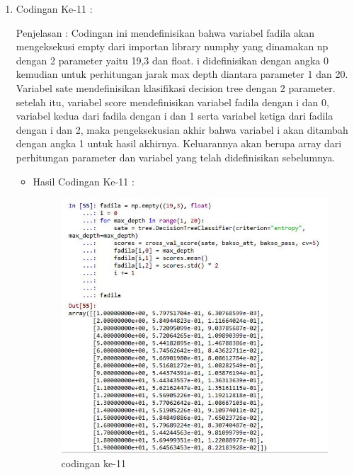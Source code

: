 \begin{enumerate}
\begin{enumerate}
\begin{enumerate}
\begin{itemize}
\end{itemize}
\par
\item Codingan Ke-11 :
\par Penjelasan : Codingan ini mendefinisikan bahwa variabel fadila akan mengeksekusi empty dari importan library numphy yang dinamakan np dengan 2 parameter yaitu 19,3 dan float. i didefinisikan dengan angka 0 kemudian untuk perhitungan jarak max depth diantara parameter 1 dan 20. Variabel sate mendefinisikan klasifikasi decision tree dengan 2 parameter. setelah itu, variabel score mendefinisikan variabel fadila dengan i dan 0, variabel kedua dari fadila dengan i dan 1 serta variabel ketiga dari fadila dengan i dan 2, maka pengeksekusian akhir bahwa variabel i akan ditambah dengan angka 1 untuk hasil akhirnya. Keluarannya akan berupa array dari perhitungan parameter dan variabel yang telah didefinisikan sebelumnya.
\par 
\begin{itemize}
\par
\item Hasil Codingan Ke-11 :

\begin{figure}[ht]
\centering
\includegraphics[scale=0.3]{figures/hasil11y.jpg}
\caption{codingan ke-11}
\label{contoh}
\end{figure}


\end{itemize}
\end{enumerate}
\end{enumerate}
\end{enumerate}
